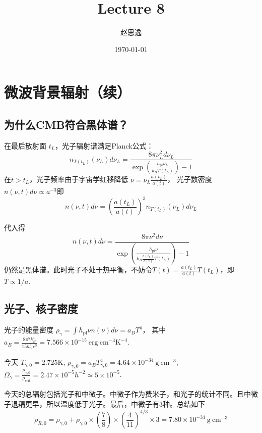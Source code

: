 \documentclass[12pt]{ctexart}
\title{Lecture 8}
\author{赵思逸}
\date{\today}
\begin{document}
\maketitle

\section*{微波背景辐射（续）}

\subsection*{为什么CMB符合黑体谱？}

在最后散射面 $t_L$，光子辐射谱满足Planck公式：
\begin{equation}
    n_{T(t_L)}(\nu_L) d \nu_L=\frac{8 \pi \nu_L^{2} d \nu_L}{\exp \left(\frac{h_\text{pl} \nu_L}{k_{B} T(t_L)} \right)-1}
\end{equation}
在$t>t_L$，光子频率由于宇宙学红移降低 $\nu=\nu_{L} \frac{a(t_L)}{a(t)}$，
光子数密度 $n\left(\nu, t\right) d\nu \propto a^{-3}$即
\begin{equation}
    n(\nu, t) d \nu=\left(\frac{a(t_L)}{a(t)}\right)^{3} n_{T\left(t_{L}\right)}\left(\nu_{L}\right) d \nu_{L}
\end{equation}

代入得
\begin{equation}
    n(\nu, t) d \nu = \frac{8 \pi \nu^{2} d \nu}{\exp \left(\frac{h_\text{pl} \nu}{k_{B} \frac{a(t_L)}{a(t)}T(t_L)}   \right)-1}
\end{equation}
仍然是黑体谱。此时光子不处于热平衡，不妨令$T(t)=\frac{a(t_L)}{a(t)}T(t_L)$，即$T\propto 1/a$.

\subsection*{光子、核子密度}

光子的能量密度 $\rho_\gamma = \int h_{\mathrm{pl}} \nu n(\nu) d\nu = a_B T^4$， 其中 $a_B=\frac{8\pi^5 k_B^4}{15 h_{\mathrm{pl}}^3 c^3 } = 7.566\times 10^{-15} \mathrm{~erg~cm^{-3}K^{-4}}$.

今天 $T_{\gamma,0} = 2.725 \mathrm{K}$, $\rho_{\gamma,0}=a_B T_{\gamma,0}^4 = 4.64\times 10^{-34} \mathrm{~g~cm^{-3}}$,
$\Omega_\gamma = \frac{\rho_{\gamma,0}}{\rho_\text{crit}} = 2.47\times 10^{-5} h^{-2} \simeq 5\times 10^{-5}$.

今天的总辐射包括光子和中微子。中微子作为费米子，和光子的统计不同。且中微子退耦更早，所以温度低于光子。最后，中微子有3种。总结如下
\begin{equation}
    \rho_{R, 0}=\rho_{\gamma, 0}+\rho_{\gamma, 0} \times\left(\frac{7}{8}\right) \times\left(\frac{4}{11}\right)^{4 / 3} \times 3 =7.80 \times 10^{-34} \mathrm{~g~cm^{-3}}
\end{equation}
\end{document}
